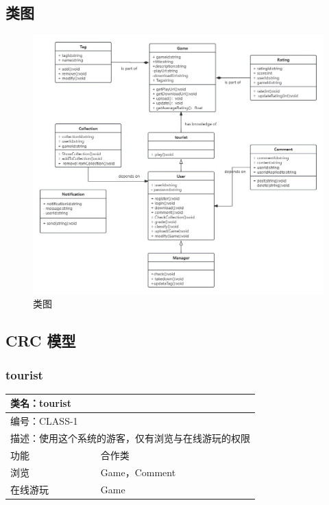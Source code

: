 \documentclass[12pt]{ctexart} %
\begin{document}
\subsection{类图}
\begin{figure}[H]
  \centering
  \includegraphics[width=1\textwidth]{lei.jpg}
  \caption{类图}
\end{figure}
\subsection{CRC 模型}

\subsubsection{tourist}
\begin{tabular}{|l|l|}
  \hline
  \multicolumn{2}{|l|}{类名：tourist} \\
  \hline
  \multicolumn{2}{|l|}{编号：CLASS-1} \\
  \hline
  \multicolumn{2}{|l|}{描述：使用这个系统的游客，仅有浏览与在线游玩的权限} \\
  \hline
  功能 & 合作类 \\
  \hline
  浏览 & Game，Comment\\
  \hline
  在线游玩 & Game\\
  \hline
  \end{tabular}
\end{document}
